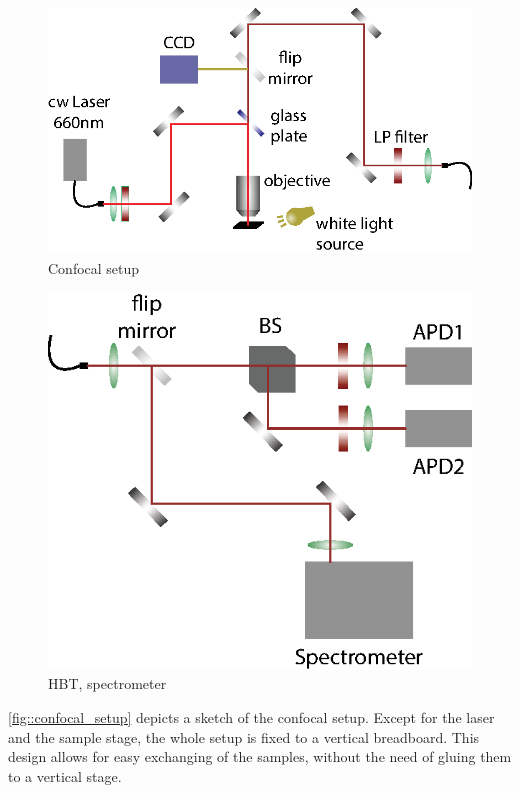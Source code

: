	\begin{figure}[t] %
		\centering
		\includegraphics[width=\linewidth]{./pics/confocal_setup.eps}
		\caption{Confocal setup}
		\label{fig::confocal_setup}
	\end{figure}

	\begin{figure}[t] %
		\centering
		\includegraphics[width=\linewidth]{./pics/hbt_spectrometer.eps}
		\caption{HBT, spectrometer}
		\label{fig::hbt_spectrometer}
	\end{figure}

	\autoref{fig::confocal_setup} depicts a sketch of the confocal setup. 
	Except for the laser and the sample stage, the whole setup is fixed to a vertical breadboard. 
	This design allows for easy exchanging of the samples, without the need of gluing them to a vertical stage.

